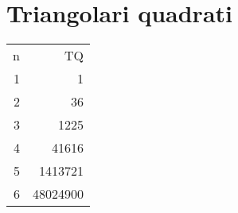 \section{Triangolari quadrati}
\begin{center}
	\begin{tabular}{RR}
	\toprule
n&TQ\\
1&1\\
2&36\\
3&1225\\
4&41616\\
5&1413721\\
6&48024900\\
\bottomrule
\end{tabular} 
\end{center}
